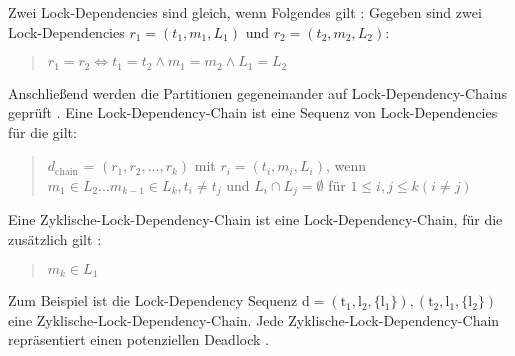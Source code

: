 Zwei Lock-Dependencies sind gleich, wenn Folgendes gilt
\autocite[vgl.][8]{MagicLock}: Gegeben sind zwei Lock-Dependencies $r_1 = (t_1,
m_1, L_1)$ und $r_2 = (t_2, m_2, L_2)$:
\begin{quote}
   $r_1 = r_2 \Leftrightarrow t_1 = t_2 \land m_1 = m_2 \land L_1 = L_2$
\end{quote}
Anschließend werden die Partitionen gegeneinander auf Lock-Dependency-Chains
geprüft \autocite[vgl.][8]{MagicLock}. Eine Lock-Dependency-Chain ist eine
Sequenz von Lock-Dependencies für die gilt:\autocite[vgl.][3]{MagicLock}
\begin{quote}
  \textbf{$d_{\mathrm{chain}}$} = $(r_1, r_2, \dots , r_k)$ mit $r_i = (t_i,
  m_i, L_i)$, wenn $m_1 \in L_2 \dots m_{k-1} \in L_k, t_i \neq t_j$ und $L_i
  \cap L_j = \emptyset$ für $1 \leq i, j \leq k (i \neq j)$
\end{quote}
\begin{samepage}
  Eine Zyklische-Lock-Dependency-Chain ist eine Lock-Dependency-Chain, für die
  zusätzlich gilt \autocite[vgl.][3]{MagicLock}:
  \begin{quote}
    $m_k \in L_1$
  \end{quote}
\end{samepage}
Zum Beispiel ist die Lock-Dependency Sequenz $\mathrm{d = (t_1, l_2, \{l_1\}),
(t_2, l_1, \{l_2\})}$ eine Zyklische-Lock-Dependency-Chain. Jede
Zyklische-Lock-Dependency-Chain repräsentiert einen potenziellen Deadlock
\autocite[vgl.][3]{MagicLock}.